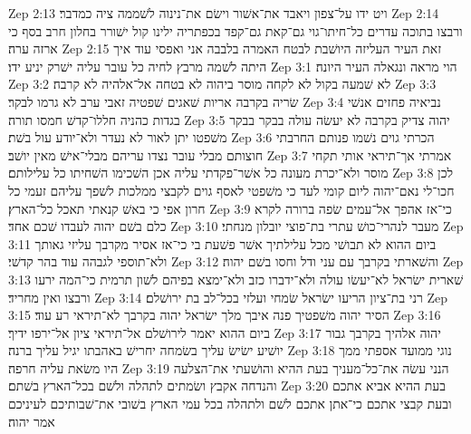 Zep 2:13  ויט ידו על־צפון ויאבד את־אשׁור וישׂם את־נינוה לשׁממה ציה כמדבר׃
Zep 2:14  ורבצו בתוכה עדרים כל־חיתו־גוי גם־קאת גם־קפד בכפתריה ילינו קול ישׁורר בחלון חרב בסף כי ארזה ערה׃
Zep 2:15  זאת העיר העליזה היושׁבת לבטח האמרה בלבבה אני ואפסי עוד איך היתה לשׁמה מרבץ לחיה כל עובר עליה ישׁרק יניע ידו׃
Zep 3:1  הוי מראה ונגאלה העיר היונה׃
Zep 3:2  לא שׁמעה בקול לא לקחה מוסר ביהוה לא בטחה אל־אלהיה לא קרבה׃
Zep 3:3  שׂריה בקרבה אריות שׁאגים שׁפטיה זאבי ערב לא גרמו לבקר׃
Zep 3:4  נביאיה פחזים אנשׁי בגדות כהניה חללו־קדשׁ חמסו תורה׃
Zep 3:5  יהוה צדיק בקרבה לא יעשׂה עולה בבקר בבקר משׁפטו יתן לאור לא נעדר ולא־יודע עול בשׁת׃
Zep 3:6  הכרתי גוים נשׁמו פנותם החרבתי חוצותם מבלי עובר נצדו עריהם מבלי־אישׁ מאין יושׁב׃
Zep 3:7  אמרתי אך־תיראי אותי תקחי מוסר ולא־יכרת מעונה כל אשׁר־פקדתי עליה אכן השׁכימו השׁחיתו כל עלילותם׃
Zep 3:8  לכן חכו־לי נאם־יהוה ליום קומי לעד כי משׁפטי לאסף גוים לקבצי ממלכות לשׁפך עליהם זעמי כל חרון אפי כי באשׁ קנאתי תאכל כל־הארץ׃
Zep 3:9  כי־אז אהפך אל־עמים שׂפה ברורה לקרא כלם בשׁם יהוה לעבדו שׁכם אחד׃
Zep 3:10  מעבר לנהרי־כושׁ עתרי בת־פוצי יובלון מנחתי׃
Zep 3:11  ביום ההוא לא תבושׁי מכל עלילתיך אשׁר פשׁעת בי כי־אז אסיר מקרבך עליזי גאותך ולא־תוספי לגבהה עוד בהר קדשׁי׃
Zep 3:12  והשׁארתי בקרבך עם עני ודל וחסו בשׁם יהוה׃
Zep 3:13  שׁארית ישׂראל לא־יעשׂו עולה ולא־ידברו כזב ולא־ימצא בפיהם לשׁון תרמית כי־המה ירעו ורבצו ואין מחריד׃
Zep 3:14  רני בת־ציון הריעו ישׂראל שׂמחי ועלזי בכל־לב בת ירושׁלם׃
Zep 3:15  הסיר יהוה משׁפטיך פנה איבך מלך ישׂראל יהוה בקרבך לא־תיראי רע עוד׃
Zep 3:16  ביום ההוא יאמר לירושׁלם אל־תיראי ציון אל־ירפו ידיך׃
Zep 3:17  יהוה אלהיך בקרבך גבור יושׁיע ישׂישׂ עליך בשׂמחה יחרישׁ באהבתו יגיל עליך ברנה׃
Zep 3:18  נוגי ממועד אספתי ממך היו משׂאת עליה חרפה׃
Zep 3:19  הנני עשׂה את־כל־מעניך בעת ההיא והושׁעתי את־הצלעה והנדחה אקבץ ושׂמתים לתהלה ולשׁם בכל־הארץ בשׁתם׃
Zep 3:20  בעת ההיא אביא אתכם ובעת קבצי אתכם כי־אתן אתכם לשׁם ולתהלה בכל עמי הארץ בשׁובי את־שׁבותיכם לעיניכם אמר יהוה׃


